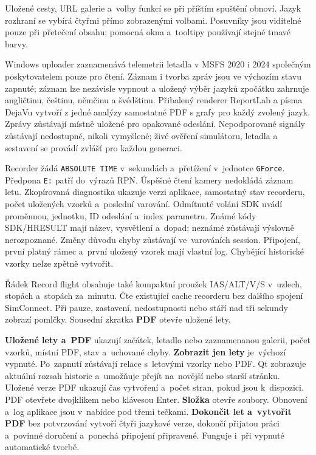 \documentclass[11pt,a4paper]{article}
\newcommand{\ui}[1]{\textbf{#1}}
\begin{document}
Uložené cesty, URL galerie a~volby funkcí se při příštím spuštění obnoví.
Jazyk rozhraní se vybírá čtyřmi přímo zobrazenými volbami. Posuvníky jsou
viditelné pouze při přetečení obsahu; pomocná okna a~tooltipy používají
stejné tmavé barvy.

Windows uploader zaznamenává telemetrii letadla v MSFS 2020 i 2024 společným
poskytovatelem pouze pro čtení. Záznam i tvorba zpráv jsou ve výchozím stavu
zapnuté; záznam lze nezávisle vypnout a uložený výběr jazyků zpočátku zahrnuje
angličtinu, češtinu, němčinu a švédštinu. Přibalený renderer ReportLab a písma
DejaVu vytvoří z jedné analýzy samostatné PDF s grafy pro každý zvolený jazyk.
Zprávy zůstávají místně uložené pro opakované odeslání. Nepodporované signály
zůstávají nedostupné, nikoli vymyšlené; živé ověření simulátoru, letadla a
sestavení se provádí zvlášť pro každou generaci.

Recorder žádá \texttt{ABSOLUTE TIME} v~sekundách a~přetížení v~jednotce
\texttt{GForce}. Předpona \texttt{E:} patří do~výrazů RPN.
Úspěšné čtení kamery nedokládá záznam letu. Zkopírovaná diagnostika ukazuje
verzi aplikace, samostatný stav recorderu, počet uložených vzorků a~poslední
varování. Odmítnuté volání SDK uvádí proměnnou, jednotku, ID odeslání a~index
parametru. Známé kódy SDK/HRESULT mají název, vysvětlení a~dopad; neznámé
zůstávají výslovně nerozpoznané. Změny důvodu chyby zůstávají ve~varováních
session. Připojení, první platný rámec a~první uložený vzorek mají vlastní log.
Chybějící historické vzorky nelze zpětně vytvořit.

Řádek Record flight obsahuje také kompaktní proužek IAS/ALT/V/S v~uzlech,
stopách a~stopách za~minutu. Čte existující cache recorderu bez dalšího spojení
SimConnect. Při pauze, zastavení, nedostupnosti nebo stáří nad tři sekundy
zobrazí pomlčky. Sousední zkratka \ui{PDF} otevře uložené lety.

\ui{Uložené lety a~PDF} ukazují začátek, letadlo nebo zaznamenanou galerii,
počet vzorků, místní PDF, stav a~uchované chyby. \ui{Zobrazit jen lety}
je~výchozí vypnuté. Po~zapnutí zůstávají relace s~letovými vzorky nebo PDF.
Qt zobrazuje aktuální rozsah historie a~umožňuje přejít na~novější nebo starší stránku.
Uložené verze PDF ukazují čas vytvoření a~počet stran, pokud jsou k~dispozici.
PDF otevřete dvojklikem nebo klávesou Enter. \ui{Složka} otevře soubory.
Obnovení a~log aplikace jsou v~nabídce pod třemi tečkami.
\ui{Dokončit let a~vytvořit PDF}
bez potvrzování vytvoří čtyři jazykové verze, dokončí přijatou práci a~povinné
doručení a~ponechá připojení připravené. Funguje i~při vypnuté automatické
tvorbě.
\end{document}
